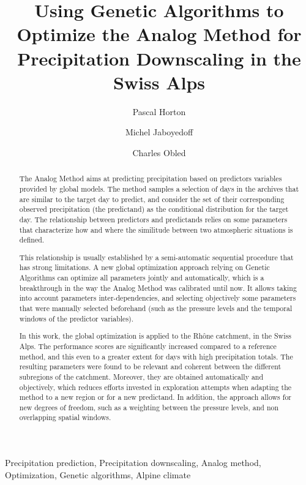 \documentclass[review]{elsarticle}
\begin{document}
\begin{frontmatter}

\title{Using Genetic Algorithms to Optimize the Analog Method for Precipitation Downscaling in the Swiss Alps}

\author[unil,terranum]{Pascal Horton}

\author[unil]{Michel Jaboyedoff}
\author[lthe]{Charles Obled}

\address[unil]{University of Lausanne, Lausanne, Switzerland}
\address[terranum]{Terranum, Rue de l'industrie 35 bis, 1030 Bussigny, Switzerland}
\address[lthe]{Universit\'{e} de Grenoble-Alpes, LTHE, Grenoble, France}

\begin{abstract}
The Analog Method aims at predicting precipitation based on predictors variables provided by global models. The method samples a selection of days in the archives that are similar to the target day to predict, and consider the set of their corresponding observed precipitation (the predictand) as the conditional distribution for the target day. The relationship between predictors and predictands relies on some parameters that characterize how and where the similitude between two atmospheric situations is defined.

This relationship is usually established by a semi-automatic sequential procedure that has strong limitations. A new global optimization approach relying on Genetic Algorithms can optimize all parameters jointly and automatically, which is a breakthrough in the way the Analog Method was calibrated until now. It allows taking into account parameters inter-dependencies, and selecting objectively some parameters that were manually selected beforehand (such as the pressure levels and the temporal windows of the predictor variables).

In this work, the global optimization is applied to the Rh\^{o}ne catchment, in the Swiss Alps. The performance scores are significantly increased compared to a reference method, and this even to a greater extent for days with high precipitation totals. The resulting parameters were found to be relevant and coherent between the different subregions of the catchment. Moreover, they are obtained automatically and objectively, which reduces efforts invested in exploration attempts when adapting the method to a new region or for a new predictand. In addition, the approach allows for new degrees of freedom, such as a weighting between the pressure levels, and non overlapping spatial windows.
\end{abstract}

\begin{keyword}
Precipitation prediction\sep
Precipitation downscaling\sep
Analog method\sep
Optimization\sep
Genetic algorithms\sep
Alpine climate
\end{keyword}

\end{frontmatter}
\end{document}
